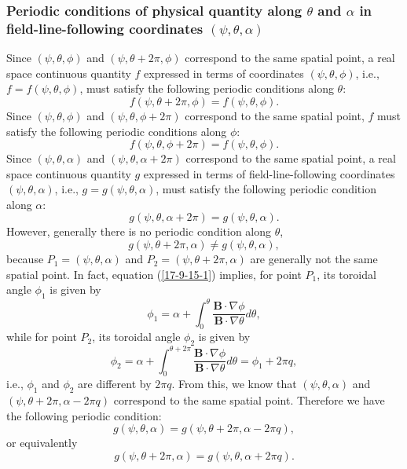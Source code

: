 \documentclass{llncs}
\begin{document}
\subsubsection{Periodic conditions of physical quantity along $\theta$ and
$\alpha$ in field-line-following coordinates $(\psi, \theta,
\alpha)$}\label{17-11-10-3}

Since $(\psi, \theta, \phi)$ and $(\psi, \theta + 2 \pi, \phi)$ correspond to
the same spatial point, a real space continuous quantity $f$ expressed in
terms of coordinates $(\psi, \theta, \phi)$, i.e., $f = f (\psi, \theta,
\phi)$, must satisfy the following periodic conditions along $\theta$:
\begin{equation}
  f (\psi, \theta + 2 \pi, \phi) = f (\psi, \theta, \phi) .
\end{equation}
Since $(\psi, \theta, \phi)$ and $(\psi, \theta, \phi + 2 \pi)$ correspond to
the same spatial point, $f$ must satisfy the following periodic conditions
along $\phi$:
\begin{equation}
  f (\psi, \theta, \phi + 2 \pi) = f (\psi, \theta, \phi) .
\end{equation}
Since $(\psi, \theta, \alpha)$ and $(\psi, \theta, \alpha + 2 \pi)$ correspond
to the same spatial point, a real space continuous quantity $g$ expressed in
terms of field-line-following coordinates $(\psi, \theta, \alpha)$, i.e., $g =
g (\psi, \theta, \alpha)$, must satisfy the following periodic condition along
$\alpha$:
\begin{equation}
  g (\psi, \theta, \alpha + 2 \pi) = g (\psi, \theta, \alpha) .
\end{equation}
However, generally there is no periodic condition along $\theta$,
\begin{equation}
  g (\psi, \theta + 2 \pi, \alpha) \neq g (\psi, \theta, \alpha),
\end{equation}
because $P_1 = (\psi, \theta, \alpha)$ and $P_2 = (\psi, \theta + 2 \pi,
\alpha)$ are generally not the same spatial point. In fact, equation
(\ref{17-9-15-1}) implies, for point $P_1$, its toroidal angle $\phi_1$ is
given by
\begin{equation}
  \phi_1 = \alpha + \int_0^{\theta} \frac{\mathbf{B} \cdot \nabla
  \phi}{\mathbf{B} \cdot \nabla \theta} d \theta,
\end{equation}
while for point $P_2$, its toroidal angle $\phi_2$ is given by
\begin{equation}
  \phi_2 = \alpha + \int_0^{\theta + 2 \pi} \frac{\mathbf{B} \cdot \nabla
  \phi}{\mathbf{B} \cdot \nabla \theta} d \theta = \phi_1 + 2 \pi q,
\end{equation}
i.e., $\phi_1$ and $\phi_2$ are different by $2 \pi q$. From this, we know
that $(\psi, \theta, \alpha)$ and $(\psi, \theta + 2 \pi, \alpha - 2 \pi q)$
correspond to the same spatial point. Therefore we have the following periodic
condition:
\begin{equation}
  \label{17-11-2-p1} g (\psi, \theta, \alpha) = g (\psi, \theta + 2 \pi,
  \alpha - 2 \pi q),
\end{equation}
or equivalently
\begin{equation}
  \label{21-9-30-1} g (\psi, \theta + 2 \pi, \alpha) = g (\psi, \theta, \alpha
  + 2 \pi q) .
\end{equation}
\end{document}

